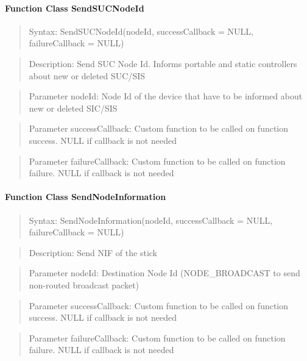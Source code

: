 \paragraph{Function Class SendSUCNodeId}
\begin{quote}Syntax: SendSUCNodeId(nodeId, successCallback = NULL, failureCallback = NULL)\end{quote}
\begin{quote}Description: Send SUC Node Id. Informs portable and static controllers about new or deleted SUC/SIS\end{quote}
\begin{quote}Parameter nodeId: Node Id of the device that have to be informed about new or deleted SIC/SIS\end{quote}
\begin{quote}Parameter successCallback: Custom function to be called on function success. NULL if callback is not needed\end{quote}
\begin{quote}Parameter failureCallback: Custom function to be called on function failure. NULL if callback is not needed\end{quote}


\paragraph{Function Class SendNodeInformation}
\begin{quote}Syntax: SendNodeInformation(nodeId, successCallback = NULL, failureCallback = NULL)\end{quote}
\begin{quote}Description: Send NIF of the stick\end{quote}
\begin{quote}Parameter nodeId: Destination Node Id (NODE\_BROADCAST to send non-routed broadcast packet)\end{quote}
\begin{quote}Parameter successCallback: Custom function to be called on function success. NULL if callback is not needed\end{quote}
\begin{quote}Parameter failureCallback: Custom function to be called on function failure. NULL if callback is not needed\end{quote}


